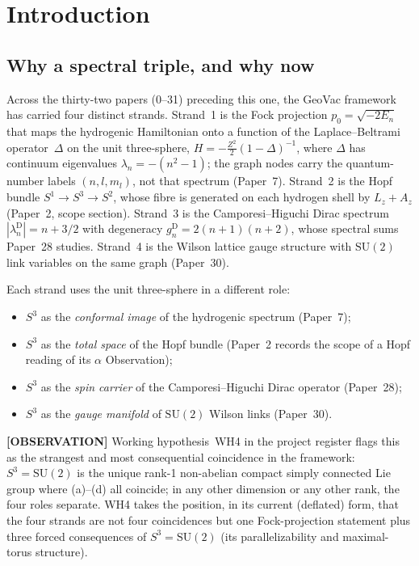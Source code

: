 \documentclass[11pt]{article}
\begin{document}
\section{Introduction}
\label{sec:intro}

\subsection{Why a spectral triple, and why now}

Across the thirty-two papers (0--31) preceding this one, the GeoVac framework
has carried four distinct strands.  Strand~1 is the Fock projection
$p_0 = \sqrt{-2E_n}$ that maps the hydrogenic Hamiltonian onto a function of the
Laplace--Beltrami operator~$\Delta$ on the unit three-sphere,
$H = -\tfrac{Z^2}{2}(1-\Delta)^{-1}$, where $\Delta$ has continuum eigenvalues
$\lambda_n = -(n^2 - 1)$; the graph nodes carry the quantum-number
labels $(n, l, m_l)$, not that spectrum (Paper~7).  Strand~2 is the Hopf bundle
$S^1 \to S^3 \to S^2$, whose fibre is generated on each hydrogen shell
by $L_z + A_z$ (Paper~2, scope section).  Strand~3
is the Camporesi--Higuchi Dirac spectrum
$|\lambda_n^{\mathrm{D}}| = n + 3/2$ with degeneracy
$g_n^{\mathrm{D}} = 2(n+1)(n+2)$, whose spectral sums Paper~28
studies.  Strand~4 is the Wilson lattice gauge structure with
$\mathrm{SU}(2)$ link variables on the same graph (Paper~30).

Each strand uses the unit three-sphere in a different role:
\begin{itemize}\setlength{\itemsep}{0pt}
\item[(a)] $S^3$ as the \emph{conformal image} of the hydrogenic
spectrum (Paper~7);
\item[(b)] $S^3$ as the \emph{total space} of the Hopf bundle (Paper~2
records the scope of a Hopf reading of its $\alpha$ Observation);
\item[(c)] $S^3$ as the \emph{spin carrier} of the Camporesi--Higuchi
Dirac operator (Paper~28);
\item[(d)] $S^3$ as the \emph{gauge manifold} of $\mathrm{SU}(2)$
Wilson links (Paper~30).
\end{itemize}
\textbf{[OBSERVATION]} Working hypothesis~WH4 in the project register flags this as the
strangest and most consequential coincidence in the framework: $S^3 =
\mathrm{SU}(2)$ is the unique rank-1 non-abelian compact simply
connected Lie group where (a)--(d) all coincide; in any other
dimension or any other rank, the four roles separate.  WH4 takes the
position, in its current (deflated) form, that the four strands are not
four coincidences but one Fock-projection statement plus three forced
consequences of $S^3 = \mathrm{SU}(2)$ (its parallelizability and
maximal-torus structure).
\end{document}
